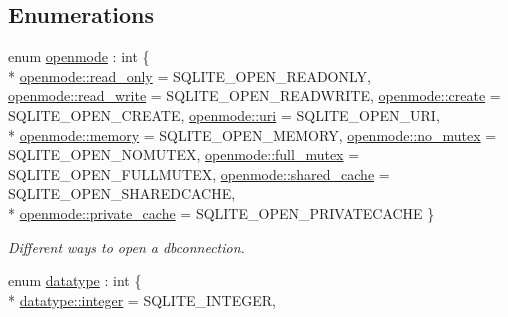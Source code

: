 \subsection*{Enumerations}
\begin{DoxyCompactItemize}
\item 
enum \hyperlink{a00038_ac886eded97b0430b2ab92e2d08fcf938}{openmode} \-: int \{ \\*
\hyperlink{a00038_ac886eded97b0430b2ab92e2d08fcf938abefe72871b2de8f4f0e20108517e31fe}{openmode\-::read\-\_\-only} = S\-Q\-L\-I\-T\-E\-\_\-\-O\-P\-E\-N\-\_\-\-R\-E\-A\-D\-O\-N\-L\-Y, 
\hyperlink{a00038_ac886eded97b0430b2ab92e2d08fcf938a06ad287ea83b37a6f9db3d8d10d72c8f}{openmode\-::read\-\_\-write} = S\-Q\-L\-I\-T\-E\-\_\-\-O\-P\-E\-N\-\_\-\-R\-E\-A\-D\-W\-R\-I\-T\-E, 
\hyperlink{a00038_ac886eded97b0430b2ab92e2d08fcf938a76ea0bebb3c22822b4f0dd9c9fd021c5}{openmode\-::create} = S\-Q\-L\-I\-T\-E\-\_\-\-O\-P\-E\-N\-\_\-\-C\-R\-E\-A\-T\-E, 
\hyperlink{a00038_ac886eded97b0430b2ab92e2d08fcf938a9305b73d359bd06734fee0b3638079e1}{openmode\-::uri} = S\-Q\-L\-I\-T\-E\-\_\-\-O\-P\-E\-N\-\_\-\-U\-R\-I, 
\\*
\hyperlink{a00038_ac886eded97b0430b2ab92e2d08fcf938acd69b4957f06cd818d7bf3d61980e291}{openmode\-::memory} = S\-Q\-L\-I\-T\-E\-\_\-\-O\-P\-E\-N\-\_\-\-M\-E\-M\-O\-R\-Y, 
\hyperlink{a00038_ac886eded97b0430b2ab92e2d08fcf938afb79f3efe5bfb497a2fdd85aca8a73bb}{openmode\-::no\-\_\-mutex} = S\-Q\-L\-I\-T\-E\-\_\-\-O\-P\-E\-N\-\_\-\-N\-O\-M\-U\-T\-E\-X, 
\hyperlink{a00038_ac886eded97b0430b2ab92e2d08fcf938addc995071d9f139c13354c2839603fac}{openmode\-::full\-\_\-mutex} = S\-Q\-L\-I\-T\-E\-\_\-\-O\-P\-E\-N\-\_\-\-F\-U\-L\-L\-M\-U\-T\-E\-X, 
\hyperlink{a00038_ac886eded97b0430b2ab92e2d08fcf938a799bb323b5a99b0e122ba5aec784d314}{openmode\-::shared\-\_\-cache} = S\-Q\-L\-I\-T\-E\-\_\-\-O\-P\-E\-N\-\_\-\-S\-H\-A\-R\-E\-D\-C\-A\-C\-H\-E, 
\\*
\hyperlink{a00038_ac886eded97b0430b2ab92e2d08fcf938a56ffbad7684376d679b1f0dcf37d8bf7}{openmode\-::private\-\_\-cache} = S\-Q\-L\-I\-T\-E\-\_\-\-O\-P\-E\-N\-\_\-\-P\-R\-I\-V\-A\-T\-E\-C\-A\-C\-H\-E
 \}
\begin{DoxyCompactList}\small\item\em Different ways to open a dbconnection. \end{DoxyCompactList}\item 
enum \hyperlink{a00038_a7467e5cdd32bbf7fce35aced88682dc0}{datatype} \-: int \{ \\*
\hyperlink{a00038_a7467e5cdd32bbf7fce35aced88682dc0a157db7df530023575515d366c9b672e8}{datatype\-::integer} = S\-Q\-L\-I\-T\-E\-\_\-\-I\-N\-T\-E\-G\-E\-R, 

\end{DoxyCompactItemize}
